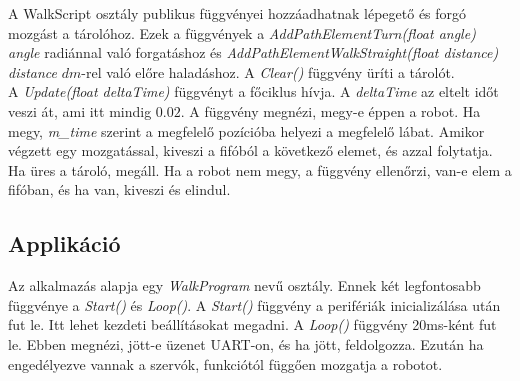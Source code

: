 \documentclass{article}
\begin{document}
A WalkScript osztály publikus függvényei hozzáadhatnak lépegető és forgó mozgást a tárolóhoz. Ezek a függvények a \textit{AddPathElementTurn(float angle)} \textit{angle} radiánnal való forgatáshoz és \textit{AddPathElementWalkStraight(float distance)} \textit{distance} $dm$-rel való előre haladáshoz. A \textit{Clear()} függvény üríti a tárolót.\\
A \textit{Update(float deltaTime)} függvényt a főciklus hívja. A \textit{deltaTime} az eltelt időt veszi át, ami itt mindig $0.02$. A függvény megnézi, megy-e éppen a robot. Ha megy, \textit{m\_time} szerint a megfelelő pozícióba helyezi a megfelelő lábat. Amikor végzett egy mozgatással, kiveszi a fifóból a következő elemet, és azzal folytatja. Ha üres a tároló, megáll. Ha a robot nem megy, a függvény ellenőrzi, van-e elem a fifóban, és ha van, kiveszi és elindul.
\subsection{Applikáció}
Az alkalmazás alapja egy \textit{WalkProgram} nevű osztály. Ennek két legfontosabb függvénye a \textit{Start()} és \textit{Loop()}. A \textit{Start()} függvény a perifériák inicializálása után fut le. Itt lehet kezdeti beállításokat megadni. A  \textit{Loop()} függvény 20ms-ként fut le. Ebben megnézi, jött-e üzenet UART-on, és ha jött, feldolgozza. Ezután ha engedélyezve vannak a szervók, funkciótól függően mozgatja a robotot.
\end{document}
